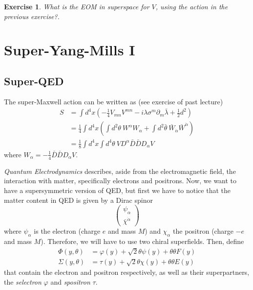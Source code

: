 \documentclass[a4paper,12pt]{article}
\newtheorem{exe}{Exercise}
\numberwithin{equation}{section}
\numberwithin{exe}{section}
\newcommand{\p}{{\partial}}
\newcommand{\Db}{{\bar D}}
\newcommand{\Wb}{{\bar W}}
\renewcommand{\a}{{\alpha}}
\newcommand{\ad}{{\dot\alpha}}
\renewcommand{\l}{{\lambda}}
\newcommand{\lb}{{\bar\lambda}}
\newcommand{\s}{{\sigma}}
\renewcommand{\S}{{\Sigma}}
\renewcommand{\t}{{\theta}}
\newcommand{\tb}{{\bar\theta}}
\newcommand{\vphi}{{\varphi}}
\newcommand{\chib}{{\bar\chi}}
\begin{document}
	\begin{exe}
	What is the EOM in superspace for $V$, using the action in the previous exercise?.
	\end{exe}


\newpage

\section{Super-Yang-Mills I}

\subsection{Super-QED}

The super-Maxwell action can be written as (see exercise of past lecture)
	\begin{align}
	S & = \int d^4 x\left( -\frac14 V_{mn}V^{mn} - i\l\s^m\p_m\lb + \frac12 d^2\right) \nonumber \\
	& = \frac14 \int d^4 x\left( \int d^2 \t\ W^\a W_\a + \int d^2\tb\ \Wb_\ad \Wb^\ad\right)  \nonumber \\
	& = \frac18 \int d^4 x\int d^4\t\ V D^\a\Db\Db D_\a V
	\end{align}
where $W_\a = -\frac14 \Db\Db D_\a V$.

{\it Quantum Electrodynamics} describes, aside from the electromagnetic field, the interaction with matter, specifically electrons and positrons. Now, we want to have a supersymmetric version of QED, but first we have to notice that the matter content in QED is given by a Dirac spinor
	\begin{equation}
	\left(
		\begin{array}{c}
		\psi_\a \\
		\chib^\ad
		\end{array}
	\right)
	\end{equation}
where $\psi_\a$ is the electron (charge $e$ and mass $M$) and $\chi_\a$ the positron (charge $-e$ and mass $M$). Therefore, we will have to use two chiral superfields. Then, define
	\begin{align}
	\Phi(y,\t) & = \vphi(y) + \sqrt2 \t\psi(y) + \t\t F(y) \\
	\S(y,\t) & = \tau(y) + \sqrt2 \t\chi(y) + \t\t E(y)
	\end{align}
that contain the electron and positron respectively, as well as their superpartners, the {\it selectron} $\vphi$ and {\it spositron} $\tau$.
\end{document}
